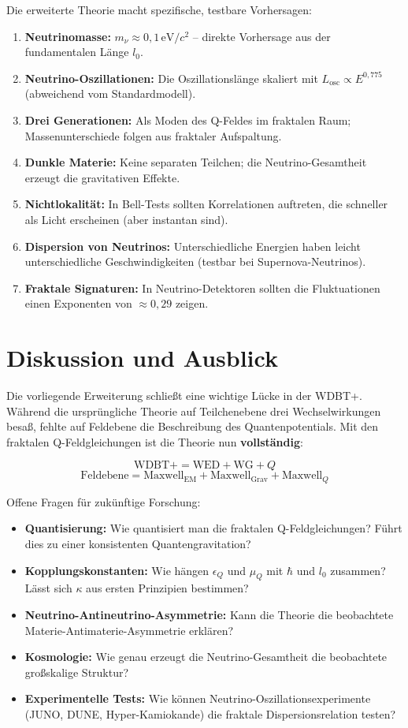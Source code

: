 \documentclass[12pt,a4paper]{article}
\begin{document}
Die erweiterte Theorie macht spezifische, testbare Vorhersagen:

\begin{enumerate}
    \item \textbf{Neutrinomasse:} \(m_\nu \approx 0,1 \, \text{eV}/c^2\) – direkte Vorhersage aus der fundamentalen Länge \(l_0\).
    \item \textbf{Neutrino-Oszillationen:} Die Oszillationslänge skaliert mit \(L_{\text{osc}} \propto E^{0,775}\) (abweichend vom Standardmodell).
    \item \textbf{Drei Generationen:} Als Moden des Q-Feldes im fraktalen Raum; Massenunterschiede folgen aus fraktaler Aufspaltung.
    \item \textbf{Dunkle Materie:} Keine separaten Teilchen; die Neutrino-Gesamtheit erzeugt die gravitativen Effekte.
    \item \textbf{Nichtlokalität:} In Bell-Tests sollten Korrelationen auftreten, die schneller als Licht erscheinen (aber instantan sind).
    \item \textbf{Dispersion von Neutrinos:} Unterschiedliche Energien haben leicht unterschiedliche Geschwindigkeiten (testbar bei Supernova-Neutrinos).
    \item \textbf{Fraktale Signaturen:} In Neutrino-Detektoren sollten die Fluktuationen einen Exponenten von \(\approx 0,29\) zeigen.
\end{enumerate}

\section{Diskussion und Ausblick}

Die vorliegende Erweiterung schließt eine wichtige Lücke in der WDBT+. Während die ursprüngliche Theorie auf Teilchenebene drei Wechselwirkungen besaß, fehlte auf Feldebene die Beschreibung des Quantenpotentials. Mit den fraktalen Q-Feldgleichungen ist die Theorie nun \textbf{vollständig}:

\[
\text{WDBT+} = \text{WED} + \text{WG} + Q
\]
\[
\text{Feldebene} = \text{Maxwell}_\text{EM} + \text{Maxwell}_\text{Grav} + \text{Maxwell}_Q
\]

Offene Fragen für zukünftige Forschung:

\begin{itemize}
    \item \textbf{Quantisierung:} Wie quantisiert man die fraktalen Q-Feldgleichungen? Führt dies zu einer konsistenten Quantengravitation?
    \item \textbf{Kopplungskonstanten:} Wie hängen \(\epsilon_Q\) und \(\mu_Q\) mit \(\hbar\) und \(l_0\) zusammen? Lässt sich \(\kappa\) aus ersten Prinzipien bestimmen?
    \item \textbf{Neutrino-Antineutrino-Asymmetrie:} Kann die Theorie die beobachtete Materie-Antimaterie-Asymmetrie erklären?
    \item \textbf{Kosmologie:} Wie genau erzeugt die Neutrino-Gesamtheit die beobachtete großskalige Struktur?
    \item \textbf{Experimentelle Tests:} Wie können Neutrino-Oszillationsexperimente (JUNO, DUNE, Hyper-Kamiokande) die fraktale Dispersionsrelation testen?
\end{itemize}
\end{document}
